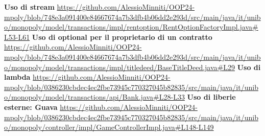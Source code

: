 \textbf{Uso di stream}\newline
\url{https://github.com/AlessioMinniti/OOP24-mpoly/blob/748e3a091400e84667674a7b3dfb4b06dd2e293d/src/main/java/it/unibo/monopoly/model/transactions/impl/rentoption/RentOptionFactoryImpl.java#L53-L61}\newline
\textbf{Uso di optional per il proprietario di un contratto}\newline
\url{https://github.com/AlessioMinniti/OOP24-mpoly/blob/748e3a091400e84667674a7b3dfb4b06dd2e293d/src/main/java/it/unibo/monopoly/model/transactions/impl/titledeed/BaseTitleDeed.java#L29}\newline
\textbf{Uso di lambda}\newline
\url{https://github.com/AlessioMinniti/OOP24-mpoly/blob/0386230cbdec4ec2fbe73945c770327045b82835/src/main/java/it/unibo/monopoly/model/transactions/api/Bank.java#L28-L33}\newline
\textbf{Uso di liberie esterne: Guava}
\url{https://github.com/AlessioMinniti/OOP24-mpoly/blob/0386230cbdec4ec2fbe73945c770327045b82835/src/main/java/it/unibo/monopoly/controller/impl/GameControllerImpl.java#L148-L149}\newline